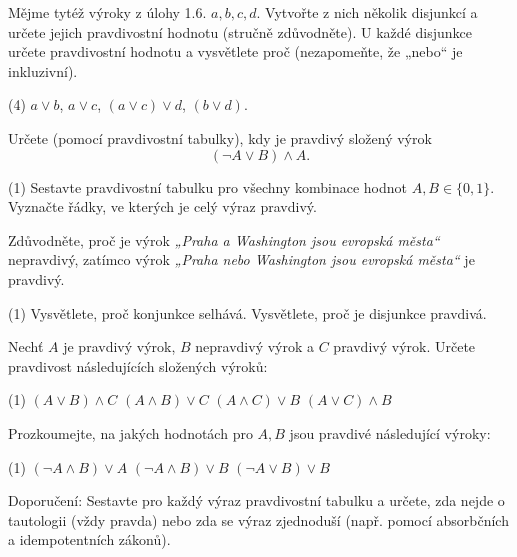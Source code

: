 \documentclass[12pt,a4paper]{article}
\begin{document}
\begin{exercise}
Mějme tytéž výroky z úlohy 1.6. $a, b, c, d$. 
Vytvořte z nich několik disjunkcí a určete jejich pravdivostní hodnotu (stručně zdůvodněte).
U každé disjunkce určete pravdivostní hodnotu a vysvětlete proč (nezapomeňte, že „nebo“ je inkluzivní).
\begin{tasks}(4)
\task $a\lor b$, 
\task $a\lor c$, 
\task $(a\lor c) \lor d$,
\task $(b\lor d)$.
\end{tasks}
\end{exercise}

\begin{exercise}
Určete (pomocí pravdivostní tabulky), kdy je pravdivý složený výrok
\[
(\neg A \lor B) \land A.
\]
\begin{tasks}(1)
\task Sestavte pravdivostní tabulku pro všechny kombinace hodnot $A,B\in\{0,1\}$.
\task Vyznačte řádky, ve kterých je celý výraz pravdivý.
\end{tasks}
\end{exercise}

\begin{exercise}
Zdůvodněte, proč je výrok \emph{„Praha a Washington jsou evropská města“} nepravdivý, 
zatímco výrok \emph{„Praha nebo Washington jsou evropská města“} je pravdivý.
\begin{tasks}(1)
\task Vysvětlete, proč konjunkce selhává.
\task Vysvětlete, proč je disjunkce pravdivá.
\end{tasks}
\end{exercise}

\begin{exercise}
Nechť $A$ je pravdivý výrok, $B$ nepravdivý výrok a $C$ pravdivý výrok. Určete pravdivost následujících složených výroků:
\begin{tasks}(1)
\task $(A \lor B) \land C$
\task $(A \land B) \lor C$
\task $(A \land C) \lor B$
\task $(A \lor C) \land B$
\end{tasks}
\end{exercise}

\begin{exercise}
Prozkoumejte, na jakých hodnotách pro $A,B$ jsou pravdivé následující výroky:
\begin{tasks}(1)
\task $(\neg A \land B) \lor A$
\task $(\neg A \land B) \lor B$
\task $(\neg A \lor B) \lor B$
\end{tasks}

\medskip
Doporučení: Sestavte pro každý výraz pravdivostní tabulku a určete, zda nejde o tautologii (vždy pravda) nebo zda se výraz zjednoduší
(např. pomocí absorbčních a idempotentních zákonů).
\end{exercise}
\end{document}
